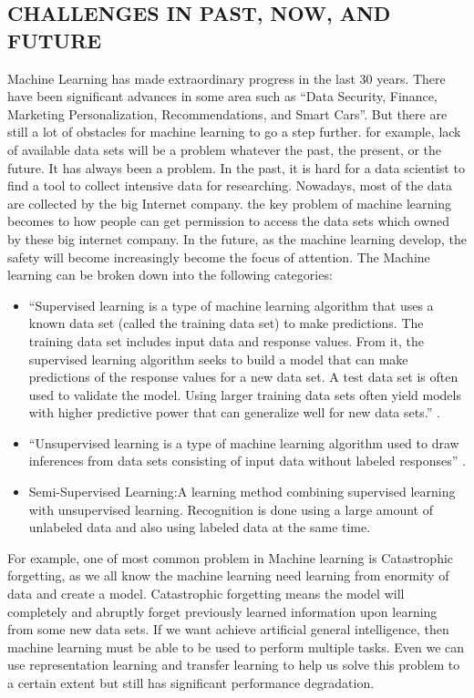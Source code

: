 \documentclass[sigconf]{acmart}
\begin{document}
\subsection{CHALLENGES IN PAST, NOW, AND FUTURE}
Machine Learning has made extraordinary progress in the last 30 years. There have been significant advances in some area such as ``Data Security, Finance, Marketing Personalization, Recommendations, and Smart Cars''. But there are still a lot of obstacles for machine learning to go a step further. for example, lack of available data sets will be a problem whatever the past, the present, or the future. It has always been a problem. In the past, it is hard for a data scientist to find a tool to collect intensive data for researching. Nowadays, most of the data are collected by the big Internet company. the key problem of machine learning becomes to how people can get permission to access the data sets which owned by these big internet company. In the future, as the machine learning develop, the safety will become increasingly become the focus of attention. The Machine learning can be broken down into the following categories:
\begin{itemize}

  \item ``Supervised learning is a type of machine learning algorithm that uses a known data set (called the training data set) to make predictions. The training data set includes input data and response values. From it, the supervised learning algorithm seeks to build a model that can make predictions of the response values for a new data set. A test data set is often used to validate the model. Using larger training data sets often yield models with higher predictive power that can generalize well for new data sets.'' \cite{Mathworks02}.
  
  
  \item ``Unsupervised learning is a type of machine learning algorithm used to draw inferences from data sets consisting of input data without labeled responses'' \cite{Mathworks01}.
  
  
  \item Semi-Supervised Learning:A learning method combining supervised learning with unsupervised learning. Recognition is done using a large amount of unlabeled data and also using labeled data at the same time.
  

  
\end{itemize}
For example, one of most common problem in Machine learning is Catastrophic forgetting, as we all know the machine learning need learning from enormity of data and create a model. Catastrophic forgetting means the model will completely and abruptly forget previously learned information upon learning from some new data sets. If we want achieve artificial general intelligence, then machine learning must be able to be used to perform multiple tasks. Even we can use representation learning and transfer learning to help us solve this problem to a certain extent but still has significant performance degradation.
\end{document}
